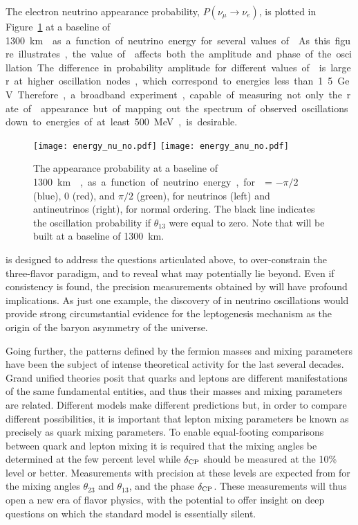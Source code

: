 The electron neutrino appearance probability, $P(\nu_\mu \rightarrow \nu_e)$, 
is plotted in 
Figure~\ref{fig:oscprob} at a baseline of \SI{1300}\km{} as a function of neutrino 
energy for several values of \deltacp. As this figure illustrates, the value 
of \deltacp affects both the amplitude and phase of
the oscillation. The difference in probability amplitude
for different values of \deltacp is larger at higher oscillation nodes, which 
correspond to energies less than 1.5~GeV. Therefore, a broadband experiment, 
capable of measuring not only the rate of \nue appearance but of mapping out the 
spectrum of observed oscillations down to energies of at least 500~MeV, is desirable. 

\begin{figure}
  \centering
\texttt{[image: energy\_nu\_no.pdf]}
\texttt{[image: energy\_anu\_no.pdf]}
  \caption[Appearance probabilities for \nue and \anue at \SI{1300}{\km}]{The appearance probability at a baseline of \SI{1300}\km{},
  as a function of neutrino energy, for \deltacp = $-\pi/2$ (blue), 
  0 (red), and $\pi/2$ (green), for neutrinos (left) and antineutrinos
  (right), for normal ordering. The black line indicates the oscillation
  probability if $\theta_{13}$ were equal to zero. Note that  will be built at a baseline of \SI{1300}{\km}.}
  \label{fig:oscprob}
\end{figure}

 is designed to address the questions articulated above, 
to over-constrain the three-flavor paradigm, 
and to reveal what may potentially lie beyond.  
Even if consistency is found, the precision measurements 
obtained by  will have profound implications. As just one example, 
the discovery of  in neutrino oscillations would provide 
strong circumstantial evidence for the leptogenesis mechanism as 
the origin of the baryon asymmetry of the universe.  

Going further, the patterns defined by the fermion masses and 
mixing parameters have been the subject of intense theoretical 
activity for the last several decades.  Grand unified theories 
posit that quarks and leptons are different manifestations of the same 
fundamental entities, and thus their masses and mixing parameters 
are related. Different models make different predictions but, 
in order to compare different possibilities, it is important that 
lepton mixing parameters be known as precisely as quark mixing parameters.
To enable equal-footing comparisons between quark and lepton mixing 
it is required 
that the mixing angles be determined at the few percent level 
while $\delta_{\rm CP}$ should be measured at the 10\% level or better.
Measurements with precision at these levels are expected from  
for the mixing angles $\theta_{23}$ and $\theta_{13}$, 
and the  phase $\delta_{\rm CP}$.   
These measurements will thus open a new era of flavor physics, 
with the potential to offer insight on deep questions on which the 
standard model is essentially silent.

